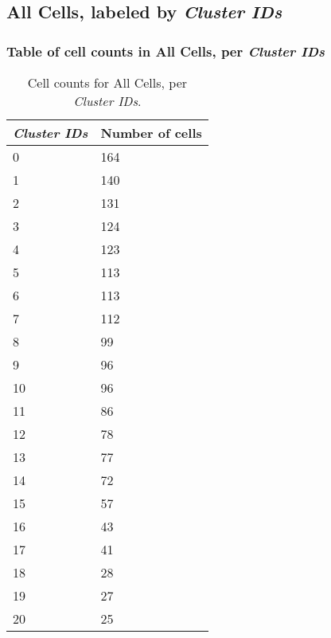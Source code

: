 \clearpage

\subsection{All Cells, labeled by \emph{Cluster IDs}}
\subsubsection{Table of cell counts in All Cells, per \emph{Cluster IDs}}\begin{table}[h]
\centering
\label{my-label}
\begin{tabular}{@{}ll@{}}
\toprule

\emph{Cluster IDs}& Number of cells \\ \midrule
0 & 164 \\

1 & 140 \\

2 & 131 \\

3 & 124 \\

4 & 123 \\

5 & 113 \\

6 & 113 \\

7 & 112 \\

8 & 99 \\

9 & 96 \\

10 & 96 \\

11 & 86 \\

12 & 78 \\

13 & 77 \\

14 & 72 \\

15 & 57 \\

16 & 43 \\

17 & 41 \\

18 & 28 \\

19 & 27 \\

20 & 25 \\
\bottomrule
\end{tabular}
\caption{Cell counts for All Cells, per \emph{Cluster IDs}.}
\end{table}

